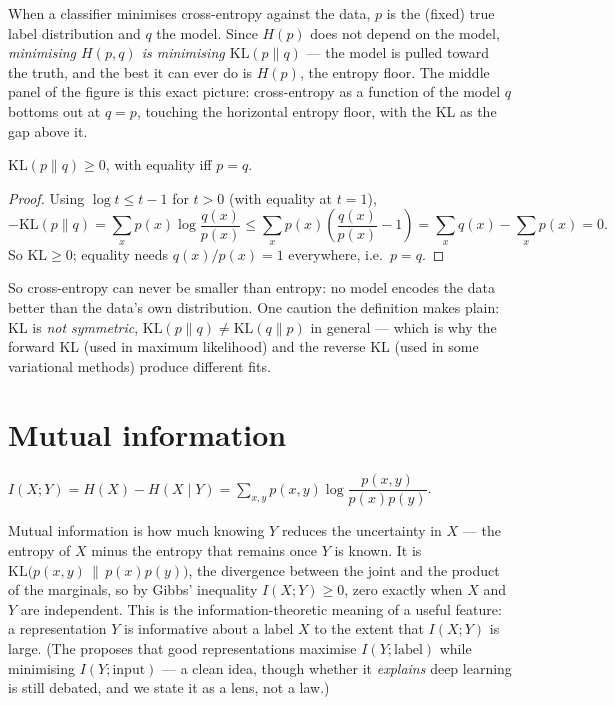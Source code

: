 \documentclass[11pt]{article}
\begin{document}
When a classifier minimises cross-entropy against the data, $p$ is the (fixed)
true label distribution and $q$ the model. Since $H(p)$ does not depend on the
model, \emph{minimising $H(p,q)$ is minimising $\mathrm{KL}(p\|q)$} --- the model
is pulled toward the truth, and the best it can ever do is $H(p)$, the entropy
floor. The middle panel of the figure is this exact picture: cross-entropy as a
function of the model $q$ bottoms out at $q=p$, touching the horizontal entropy
floor, with the KL as the gap above it.

\begin{theorem}
$\mathrm{KL}(p\|q)\ge 0$, with equality iff $p=q$.
\end{theorem}
\begin{proof}
Using $\log t \le t-1$ for $t>0$ (with equality at $t=1$),
\[
  -\mathrm{KL}(p\|q) = \sum_x p(x)\log\frac{q(x)}{p(x)}
   \le \sum_x p(x)\!\left(\frac{q(x)}{p(x)}-1\right) = \sum_x q(x) - \sum_x p(x) = 0.
\]
So $\mathrm{KL}\ge 0$; equality needs $q(x)/p(x)=1$ everywhere, i.e.\ $p=q$.
\end{proof}

So cross-entropy can never be smaller than entropy: no model encodes the data
better than the data's own distribution. One caution the definition makes plain:
KL is \emph{not symmetric}, $\mathrm{KL}(p\|q)\ne\mathrm{KL}(q\|p)$ in general ---
which is why the forward KL (used in maximum likelihood) and the reverse KL (used
in some variational methods) produce different fits.

\section{Mutual information}

\begin{definition}
$I(X;Y) = H(X) - H(X\mid Y) = \sum_{x,y} p(x,y)\log\dfrac{p(x,y)}{p(x)p(y)}$.
\end{definition}

Mutual information is how much knowing $Y$ reduces the uncertainty in $X$ --- the
entropy of $X$ minus the entropy that remains once $Y$ is known. It is
$\mathrm{KL}\big(p(x,y)\,\|\,p(x)p(y)\big)$, the divergence between the joint and
the product of the marginals, so by Gibbs' inequality $I(X;Y)\ge 0$, zero exactly
when $X$ and $Y$ are independent. This is the information-theoretic meaning of a
useful feature: a representation $Y$ is informative about a label $X$ to the
extent that $I(X;Y)$ is large. (The  proposes that
good representations maximise $I(Y;\text{label})$ while minimising
$I(Y;\text{input})$ --- a clean idea, though whether it \emph{explains} deep
learning is still debated, and we state it as a lens, not a law.)
\end{document}
